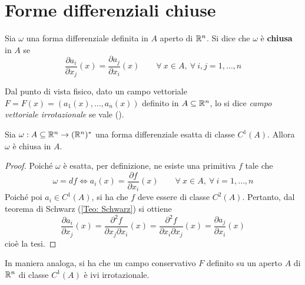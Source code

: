 \section{Forme differenziali chiuse}
\begin{definition} \label{Def: Forma differenziale chiusa}
    Sia $\omega$ una forma differenziale definita in $A$ aperto di $\mathbb{R}^n$. Si dice che $\omega$ è \textbf{chiusa} in $A$ se
    \begin{equation*}
        \frac{\partial a_i}{\partial x_j}(x)= \frac{\partial a_j}{\partial x_i}(x) \qquad \forall\ x \in A,\ \forall\ i, j = 1, \dots, n
    \end{equation*}
\end{definition}
Dal punto di vista fisico, dato un campo vettoriale $F=F(x)=(a_1(x), \dots, a_n(x))$ definito in $A \subseteq \mathbb{R}^n$, lo si dice \textit{campo vettoriale irrotazionale} se vale (\theequation). 
\begin{theorem} \label{Teo: Forma esatta => forma chiusa}
    Sia $\omega: A \subseteq \mathbb{R}^n \to (\mathbb{R}^n)^*$ una forma differenziale esatta di classe $C^1(A)$. Allora $\omega$ è chiusa in $A$.
\end{theorem}
\begin{proof}
    Poiché $\omega$ è esatta, per definizione, ne esiste una primitiva $f$ tale che
    \begin{equation*}
        \omega= df \iff a_i(x)=\frac{\partial f }{\partial x_i}(x) \qquad \forall\ x \in A,\ \forall\ i=1, \dots, n
    \end{equation*}
    Poiché poi $a_i \in C^1(A)$, si ha che $f$ deve essere di classe $C^2(A)$. Pertanto, dal teorema di Schwarz (\ref{Teo: Schwarz}) si ottiene
    \begin{equation*}
        \frac{\partial a_i}{\partial x_j}(x)= \frac{\partial^2 f}{\partial x_j \partial x_i}(x) = \frac{\partial^2 f}{\partial x_i \partial x_j}(x) = \frac{\partial a_j}{\partial x_i}(x) 
    \end{equation*}
    cioè la tesi.
\end{proof}
In maniera analoga, si ha che un campo conservativo $F$ definito su un aperto $A$ di $\mathbb{R}^n$ di classe $C^1(A)$ è ivi irrotazionale.
